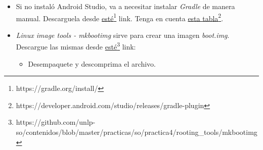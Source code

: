 \begin{itemize}
\begin{itemize}
      \item Descargue e instale/actualice los siguientes paquetes:
      \begin{itemize}
  \item \textit{Android SDK Tools}.
  \item \textit{Android SDK Platform-tools}.
  \item \textit{Android SDK Build-tools}.
  \item Android \ANDROIDVERSION(\ANDROIDVERSIONAPI) $\rightarrow$ \textit{SDK Platform}.
  \item Android Emulator.
      \end{itemize}

      \item Para facilitar el desarrollo de los ejercicios, agregue las siguientes herramientas a la varaible de entorno \textit{PATH}:
      \begin{itemize}
  \item \textit{<android-sdk-directory>/platform-tools/adb}.
  \item \textit{<android-sdk-directory>/platform-tools/fastboot}.
  \item \textit{<android-sdk-directory>/platform-tools/sqlite3}.
  \item \textit{<android-sdk-directory>/tools/android}.
  \item \textit{<android-sdk-directory>/tools/emulator-x86}\footnote{Puede encontrarse con el nombre ``emulator''.}.
      \end{itemize}
 \end{itemize}
 
 \item Si no instaló Android Studio, va a necesitar instalar \textit{Gradle} de manera manual. Descarguela desde \href{https://gradle.org/install/}{esté}\footnote{https://gradle.org/install/} link. Tenga en cuenta \href{https://developer.android.com/studio/releases/gradle-plugin}{esta tabla}\footnote{https://developer.android.com/studio/releases/gradle-plugin}.

 \item \textit{Linux image tools - mkbootimg} sirve para crear una imagen \textit{boot.img}. Descargue las mismas desde \href{https://github.com/unlp-so/contenidos/blob/master/practicas/so/practica4/rooting\_tools/mkbootimg}{esté}\footnote{https://github.com/unlp-so/contenidos/blob/master/practicas/so/practica4/rooting\_tools/mkbootimg} link:
 \begin{itemize}
      \item Desempaquete y descomprima el archivo.


\end{itemize}
\end{itemize}
